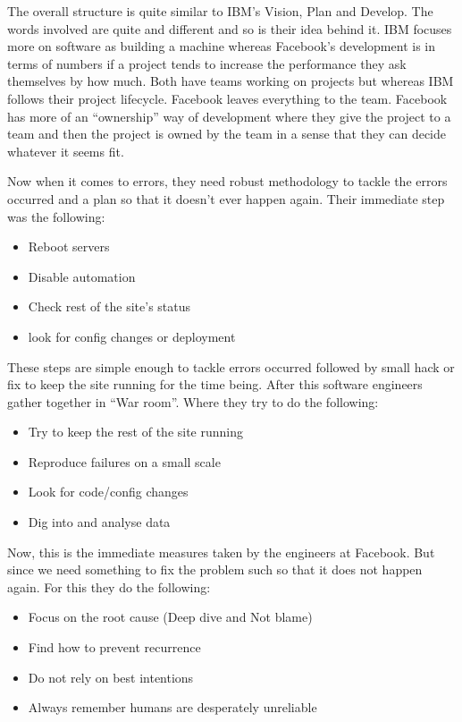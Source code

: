 The overall structure is quite similar to IBM's Vision, Plan and Develop. The words involved are quite and different and so is their idea behind it. IBM focuses more on software as building a machine whereas Facebook's development is in terms of numbers if a project tends to increase the performance they ask themselves by how much. Both have teams working on projects but whereas IBM follows their project lifecycle. Facebook leaves everything to the team. Facebook has more of an ``ownership'' way of development where they give the project to a team and then the project is owned by the team in a sense that they can decide whatever it seems fit.

Now when it comes to errors, they need robust methodology to tackle the errors occurred and a plan so that it doesn't ever happen again. Their immediate step was the following:

\begin{itemize}
      \item Reboot servers
      \item Disable automation
      \item Check rest of the site's status
      \item look for config changes or deployment
\end{itemize}

These steps are simple enough to tackle errors occurred followed by small hack or fix to keep the site running for the time being. After this software engineers gather together in ``War room''. Where they try to do the following:

\begin{itemize}
      \item Try to keep the rest of the site running
      \item Reproduce failures on a small scale
      \item Look for code/config changes
      \item Dig into and analyse data
\end{itemize}

Now, this is the immediate measures taken by the engineers at Facebook. But since we need something to fix the problem such so that it does not happen again. For this they do the following:

\begin{itemize}
      \item Focus on the root cause (Deep dive and Not blame)
      \item Find how to prevent recurrence
      \item Do not rely on best intentions
      \item Always remember humans are desperately unreliable      
\end{itemize}

